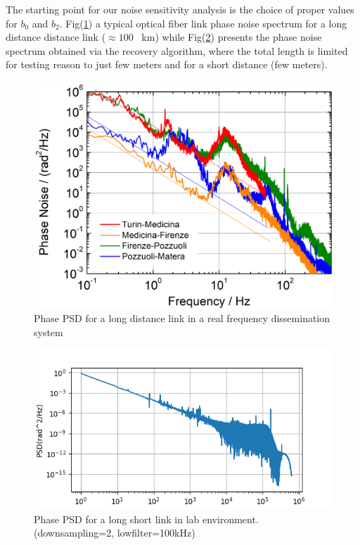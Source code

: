 \documentclass[ fontsize=11pt]{scrartcl} %
\numberwithin{equation}{section} %
\numberwithin{figure}{section} %
\numberwithin{table}{section} %
\begin{document}
The starting point for our noise sensitivity analysis is the choice of proper values for $b_0$ and $b_2$. Fig(\ref{psd_long}) a typical optical fiber link phase noise spectrum for a long distance distance link  ($\approx 100$ \SI{}{\kilo\meter}) while Fig(\ref{psd_short}) presents the phase noise spectrum obtained via the recovery algorithm, where the total length is limited for testing reason to just  few meters  and for a short distance (few meters).
\begin{figure}[hbtp]
\centering
\includegraphics[scale=0.5]{immagini_noise/noise_long.png}
\caption{Phase PSD for a long distance link in a real frequency dissemination system}
\label{psd_long}
\end{figure}

\begin{figure}[hbtp]
\centering
\includegraphics[scale=1]{immagini_noise/noise_short.png}
\caption{Phase PSD for a long short link in lab environment. (downsampling=2, lowfilter=100kHz)}
\label{psd_short}
\end{figure}
\end{document}
